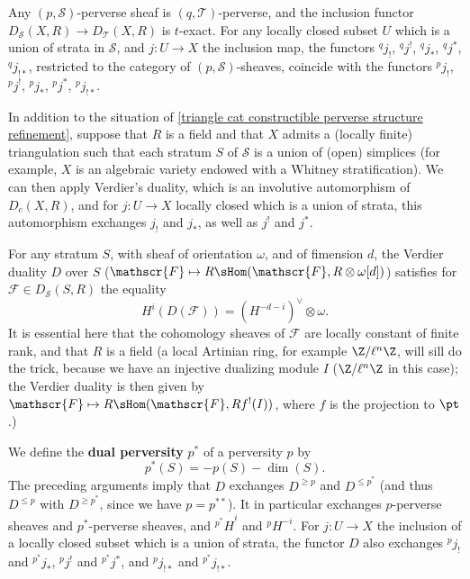 \begin{corollary}\label{triangle cat constructible perverse refinement functor prop}
Any $(p,\mathcal{S})$-perverse sheaf is $(q,\mathcal{T})$-perverse, and the inclusion functor $D_\mathcal{S}(X,R)\to D_\mathcal{T}(X,R)$ is $t$-exact. For any locally closed subset $U$ which is a union of strata in $\mathcal{S}$, and $j:U\to X$ the inclusion map, the functors ${^qj_!}$, ${^qj^!}$, ${^qj_*}$, ${^qj^*}$, ${^qj_{!*}}$, restricted to the category of $(p,\mathcal{S})$-sheaves, coincide with the functors ${^pj_!}$, ${^pj^!}$, ${^pj_*}$, ${^pj^*}$, ${^pj_{!*}}$.
\end{corollary}

In addition to the situation of \cref{triangle cat constructible perverse structure refinement}, suppose that $R$ is a field and that $X$ admits a (locally finite) triangulation such that each stratum $S$ of $\mathcal{S}$ is a union of (open) simplices (for example, $X$ is an algebraic variety endowed with a Whitney stratification). We can then apply Verdier's duality, which is an involutive automorphism of $D_c(X,R)$, and for $j:U\to X$ locally closed which is a union of strata, this automorphism exchanges $j_!$ and $j_*$, as well as $j^!$ and $j^*$.\par
For any stratum $S$, with sheaf of orientation $\omega$, and of fimension $d$, the Verdier duality $D$ over $S$ ($\mathscr{F}\mapsto R\sHom(\mathscr{F},R\otimes\omega[d])$) satisfies for $\mathscr{F}\in D_\mathcal{S}(S,R)$ the equality
\[H^i(D(\mathscr{F}))=(H^{-d-i})^{\vee}\otimes\omega.\]
It is essential here that the cohomology sheaves of $\mathscr{F}$ are locally constant of finite rank, and that $R$ is a field (a local Artinian ring, for example $\Z/\ell^n\Z$, will sill do the trick, because we have an injective dualizing module $I$ ($\Z/\ell^n\Z$ in this case); the Verdier duality is then given by $\mathscr{F}\mapsto R\sHom(\mathscr{F},Rf^!(I))$, where $f$ is the projection to $\pt$.)\par
We define the \textbf{dual perversity} $p^*$ of a perversity $p$ by
\[p^*(S)=-p(S)-\dim(S).\]
The preceding arguments imply that $D$ exchanges $D^{\geq p}$ and $D^{\leq p^*}$ (and thus $D^{\leq p}$ with $D^{\geq p^*}$, since we have $p=p^{**}$). It in particular exchanges $p$-perverse sheaves and $p^*$-perverse sheaves, and ${^{p^*}H}^i$ and ${^pH^{-i}}$. For $j:U\to X$ the inclusion of a locally closed subset which is a union of strata, the functor $D$ also exchanges ${^pj_!}$ and ${^{p^*}j_*}$, ${^pj^!}$ and ${^{p^*}j^*}$, and ${^pj_{!*}}$ and ${^{p^*}j_{!*}}$.\par
